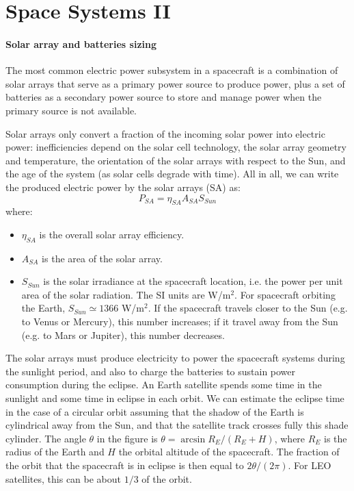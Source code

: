 \section[Space Systems II]{Space Systems II}
 
\paragraph{Solar array and batteries sizing}

The most common electric power subsystem in a spacecraft is a combination of
solar arrays that serve as a primary power source to produce power, plus a set
of batteries as a secondary power source to store and manage power when  the
primary source is not available.

Solar arrays only convert a fraction of
the incoming solar power into electric power: inefficiencies depend on the
solar cell technology, the solar array geometry and temperature, the
orientation of the solar arrays with respect to the Sun, and the age of the
system (as solar cells degrade with time). All in all, we can write the
produced electric  power by the solar arrays (SA) as:
%
\begin{equation}
P_{SA} = \eta_{SA} A_{SA} S_{Sun}
\end{equation}
%
where:
%
\begin{itemize}
\item $\eta_{SA}$ is the overall solar array efficiency.
\item $A_{SA}$ is the area of the solar array.
\item $S_{Sun}$ is the solar irradiance at the spacecraft location, i.e. the 
power per unit area of the solar radiation. The SI units are W/m$^2$. 
For spacecraft orbiting the Earth, $S_{Sun}\simeq 1366$ W/m$^2$. If the 
spacecraft travels closer to the Sun (e.g. to Venus or Mercury), this number 
increases; if it travel away from the Sun (e.g. to Mars or Jupiter), this 
number decreases.
\end{itemize}
%

The solar arrays must produce electricity to power the spacecraft systems
during the sunlight period, and also to charge the batteries to sustain
power consumption during the eclipse. 
An Earth satellite spends some time in the sunlight and some time in eclipse
in each orbit. We can estimate the eclipse time in the case of a circular
orbit assuming that the shadow of the Earth is cylindrical away from the Sun,
and that the satellite track crosses fully this shade cylinder.
The angle $\theta$ in the figure is $\theta = \arcsin{R_E/(R_E+H)}$, where
$R_E$ is the radius of the Earth and $H$ the orbital altitude of the
spacecraft. The fraction of the orbit that the spacecraft is in eclipse
is then equal to $2\theta/(2\pi)$. For LEO satellites, this can be about
$1/3$ of the orbit.

